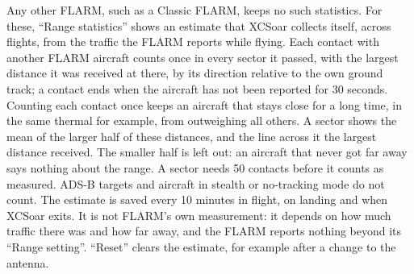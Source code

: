 Any other FLARM, such as a Classic FLARM, keeps no such statistics.
For these, ``Range statistics'' shows an estimate that XCSoar collects
itself, across flights, from the traffic the FLARM reports while
flying.  Each contact with another FLARM aircraft counts once in every
sector it passed, with the largest distance it was received at there,
by its direction relative to the own ground track; a contact ends when
the aircraft has not been reported for 30 seconds.  Counting each
contact once keeps an aircraft that stays close for a long time, in
the same thermal for example, from outweighing all others.  A sector
shows the mean of the larger half of these distances, and the line
across it the largest distance received.  The smaller half is left
out: an aircraft that never got far away says nothing about the range.
A sector needs 50 contacts before it counts as measured.  ADS-B targets and
aircraft in stealth or no-tracking mode do not count.  The estimate is
saved every 10 minutes in flight, on landing and when XCSoar exits.
It is not FLARM's own measurement: it depends on how much traffic
there was and how far away, and the FLARM reports nothing beyond its
``Range setting''.  ``Reset'' clears the estimate, for example after a
change to the antenna.
